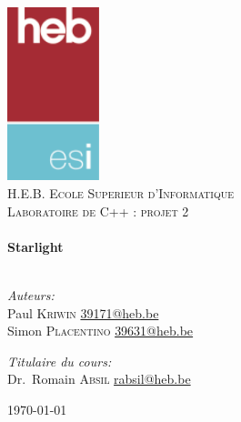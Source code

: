 \begin{titlepage}
	\begin{center}

		\includegraphics[keepaspectratio=true,width=0.20\textwidth]{./logo}\\[1cm]

		\textsc{\LARGE H.E.B. Ecole Superieur d'Informatique}\\[1.5cm]

		\textsc{\Large Laboratoire de C++ : projet 2}\\[0.5cm]

		\HRule \\[0.4cm]
		{\huge \bfseries Starlight \\[0.4cm]}
		\HRule \\[1.5cm]

		\noindent
		\begin{minipage}[t]{0.4\textwidth}
			\begin{flushleft} \large
				\emph{Auteurs:}\\
				Paul \textsc{Kriwin} \href{mailto:39171@heb.be}{39171@heb.be}\\
				Simon \textsc{Placentino} \href{mailto:39631@heb.be}{39631@heb.be}\
			\end{flushleft}
		\end{minipage}%
		\begin{minipage}[t]{0.4\textwidth}
			\begin{flushright} \large
				\emph{Titulaire du cours:} \\
				Dr.~Romain \textsc{Absil}
				\href{mailto:rabsil@heb.be}{rabsil@heb.be}
			\end{flushright}
		\end{minipage}

		\vfill

		{\large \today}

	\end{center}
	\clearpage\null\newpage
\end{titlepage}
